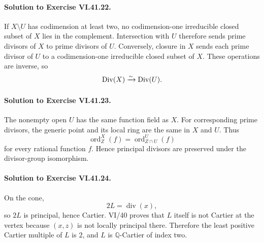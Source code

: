\paragraph{Solution to Exercise VI.41.22.}
If \(X\setminus U\) has codimension at least two, no codimension-one irreducible
closed subset of \(X\) lies in the complement. Intersection with \(U\) therefore sends
prime divisors of \(X\) to prime divisors of \(U\). Conversely, closure in \(X\) sends
each prime divisor of \(U\) to a codimension-one irreducible closed subset of \(X\).
These operations are inverse, so
\[
\operatorname{Div}(X)\xrightarrow{\sim}\operatorname{Div}(U).
\]

\paragraph{Solution to Exercise VI.41.23.}
The nonempty open \(U\) has the same function field as \(X\). For corresponding
prime divisors, the generic point and its local ring are the same in \(X\) and \(U\).
Thus
\[
\operatorname{ord}^{X}_Z(f)=\operatorname{ord}^{U}_{Z\cap U}(f)
\]
for every rational function \(f\). Hence principal divisors are preserved under the
divisor-group isomorphism.

\paragraph{Solution to Exercise VI.41.24.}
On the cone,
\[
2L=\operatorname{div}(x),
\]
so \(2L\) is principal, hence Cartier. VI/40 proves that \(L\) itself is not Cartier at
the vertex because \((x,z)\) is not locally principal there. Therefore the least
positive Cartier multiple of \(L\) is \(2\), and \(L\) is \(\mathbb Q\)-Cartier of
index two.
